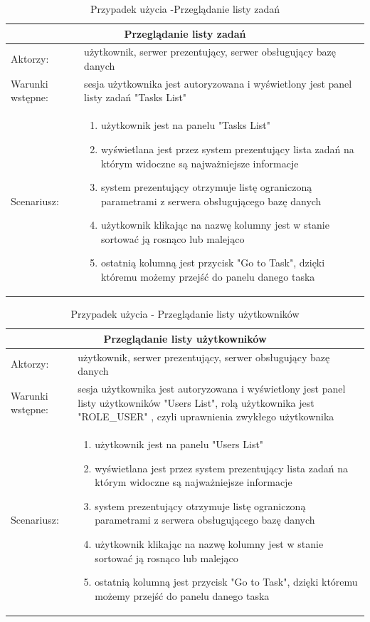 \begin{table}[h!]
	\begin{tabular}{|p{2cm}||p{13cm}|  }

\hline
\multicolumn{2}{|c|}{Przeglądanie listy zadań} \\
\hline
Aktorzy: &użytkownik, serwer prezentujący, serwer obsługujący bazę danych\\
\hline
Warunki wstępne:& sesja użytkownika jest autoryzowana i wyświetlony jest panel listy zadań "Tasks List"\\
\hline
Scenariusz: &
\begin{enumerate}
\item użytkownik jest na panelu "Tasks List"
\item wyświetlana jest przez system prezentujący  lista zadań na którym widoczne są najważniejsze informacje
\item system prezentujący otrzymuje listę ograniczoną parametrami z serwera obsługującego bazę danych
\item użytkownik klikając na nazwę kolumny jest w stanie sortować ją rosnąco lub malejąco
\item ostatnią kolumną jest przycisk "Go to Task", dzięki któremu możemy przejść do panelu danego taska
\end{enumerate}\\
\hline
	\end{tabular}
\caption{Przypadek użycia -Przeglądanie listy zadań}
\end{table}




\begin{table}[h!]
	\begin{tabular}{|p{2cm}||p{13cm}|  }
		
		\hline
		\multicolumn{2}{|c|}{Przeglądanie listy użytkowników} \\
		\hline
Aktorzy: &użytkownik, serwer prezentujący, serwer obsługujący bazę danych\\
		\hline
Warunki wstępne: &sesja użytkownika jest autoryzowana i wyświetlony jest panel listy użytkowników  "Users List", rolą użytkownika jest "ROLE\_USER" , czyli uprawnienia zwykłego użytkownika\\
		\hline
		Scenariusz: &
		\begin{enumerate}
			\item użytkownik jest na panelu "Users List"
		\item wyświetlana jest przez system prezentujący  lista zadań na którym widoczne są najważniejsze informacje
		\item system prezentujący otrzymuje listę ograniczoną parametrami z serwera obsługującego bazę danych
		\item użytkownik klikając na nazwę kolumny jest w stanie sortować ją rosnąco lub malejąco
		\item ostatnią kolumną jest przycisk "Go to Task", dzięki któremu możemy przejść do panelu danego taska
		\end{enumerate}\\
	\end{tabular}
	\caption{Przypadek użycia - Przeglądanie listy użytkowników}
\end{table}



